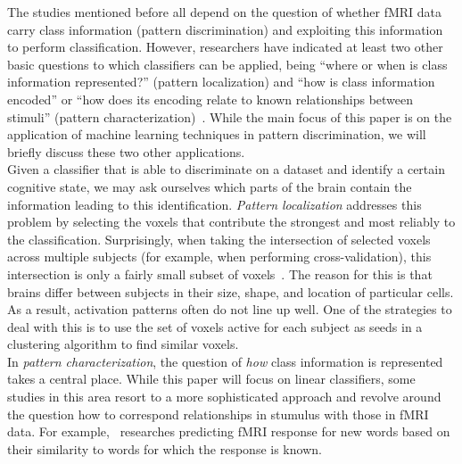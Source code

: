 \documentclass[preprint,journal,11pt]{vgtc}
\begin{document}
The studies mentioned before all depend on the question of whether fMRI data carry class
information (pattern discrimination) and exploiting this information to perform classification. However, researchers have indicated at least two other basic questions to which classifiers can be applied, being ``where or when
is class information represented?'' (pattern localization) and ``how is
class information encoded'' or ``how does its encoding relate to known
relationships between stimuli'' (pattern characterization)~\cite{pereira2009machine}. While the main focus of this paper is on the application of machine learning techniques in pattern discrimination, we will briefly discuss these two other applications.\\

Given a classifier that is able to discriminate on a dataset and identify a certain cognitive state, we may ask ourselves which parts of the brain contain the information leading to this identification. \emph{Pattern localization} addresses this problem by selecting the voxels that contribute the strongest and most reliably to the classification. Surprisingly, when taking the intersection of selected voxels across multiple subjects (for example, when performing cross-validation), this intersection is only a fairly small subset of voxels~\cite{pereira2009machine}. The reason for this is that brains differ between subjects in their size, shape, and location of particular cells. As a result, activation patterns often do not line up well. One of the strategies to deal with this is to use the set of voxels active for each subject as seeds in a clustering algorithm to find similar voxels.\\

In \emph{pattern characterization}, the question of \emph{how} class information is represented takes a central place. While this paper will focus on linear classifiers, some studies in this area resort to a more sophisticated approach and revolve around the question how to correspond relationships in stumulus with those in fMRI data. For example,~\cite{mitchell2008predicting} researches predicting fMRI response for new words based on their similarity to words for which the response is known.
\end{document}
